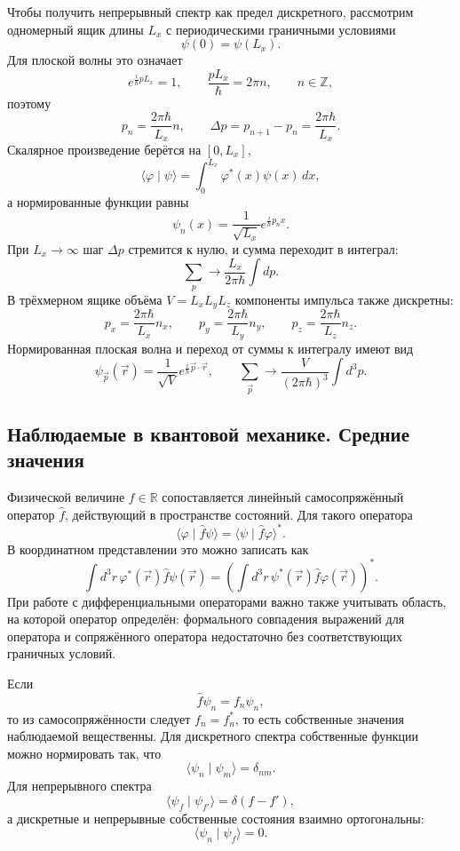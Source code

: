 \documentclass[12pt,a4paper]{article}
\begin{document}
Чтобы получить непрерывный спектр как предел дискретного, рассмотрим
одномерный ящик длины $L_x$ с периодическими граничными условиями
\[
    \psi(0)=\psi(L_x).
\]
Для плоской волны это означает
\[
    e^{\frac{i}{\hbar}pL_x}=1,
    \qquad
    \frac{pL_x}{\hbar}=2\pi n,
    \qquad n\in\mathbb Z,
\]
поэтому
\[
    p_n=\frac{2\pi\hbar}{L_x}n,
    \qquad
    \Delta p=p_{n+1}-p_n=\frac{2\pi\hbar}{L_x}.
\]
Скалярное произведение берётся на $[0,L_x]$,
\[
    \langle\varphi\mid\psi\rangle
    =\int_0^{L_x}\varphi^*(x)\psi(x)\,dx,
\]
а нормированные функции равны
\[
    \psi_n(x)=\frac{1}{\sqrt{L_x}}e^{\frac{i}{\hbar}p_nx}.
\]
При $L_x\to\infty$ шаг $\Delta p$ стремится к нулю, и сумма переходит в
интеграл:
\[
    \boxed{\sum_p\longrightarrow\frac{L_x}{2\pi\hbar}\int dp}.
\]
В трёхмерном ящике объёма $V=L_xL_yL_z$ компоненты импульса также
дискретны:
\[
    p_x=\frac{2\pi\hbar}{L_x}n_x,
    \qquad
    p_y=\frac{2\pi\hbar}{L_y}n_y,
    \qquad
    p_z=\frac{2\pi\hbar}{L_z}n_z.
\]
Нормированная плоская волна и переход от суммы к интегралу имеют вид
\[
    \psi_{\vec p}(\vec r)=\frac{1}{\sqrt V}
    e^{\frac{i}{\hbar}\vec p\cdot\vec r},
    \qquad
    \boxed{\sum_{\vec p}\longrightarrow
    \frac{V}{(2\pi\hbar)^3}\int d^3p}.
\]

\subsection{Наблюдаемые в квантовой механике. Средние значения}

Физической величине $f\in\mathbb R$ сопоставляется линейный
самосопряжённый оператор $\hat f$, действующий в пространстве состояний.
Для такого оператора
\[
    \langle\varphi\mid\hat f\psi\rangle
    =\langle\psi\mid\hat f\varphi\rangle^*.
\]
В координатном представлении это можно записать как
\[
    \int d^3r\,\varphi^*(\vec r)\hat f\psi(\vec r)
    =\left(\int d^3r\,\psi^*(\vec r)\hat f\varphi(\vec r)\right)^*.
\]
При работе с дифференциальными операторами важно также учитывать область,
на которой оператор определён: формального совпадения выражений для
оператора и сопряжённого оператора недостаточно без соответствующих
граничных условий.

Если
\[
    \hat f\psi_n=f_n\psi_n,
\]
то из самосопряжённости следует $f_n=f_n^*$, то есть собственные значения
наблюдаемой вещественны. Для дискретного спектра собственные функции можно
нормировать так, что
\[
    \langle\psi_n\mid\psi_m\rangle=\delta_{nm}.
\]
Для непрерывного спектра
\[
    \langle\psi_f\mid\psi_{f'}\rangle=\delta(f-f'),
\]
а дискретные и непрерывные собственные состояния взаимно ортогональны:
\[
    \langle\psi_n\mid\psi_f\rangle=0.
\]
\end{document}
